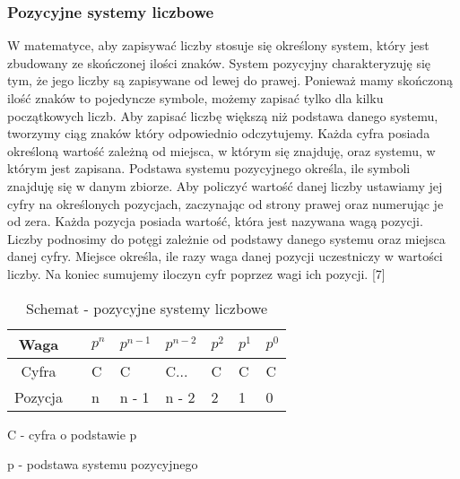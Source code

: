 \documentclass[12pt, a4paper, onside, polish]{article}				%
\begin{document}
\subsubsection{Pozycyjne systemy liczbowe}
\hspace{\parindent}
W matematyce, aby zapisywać liczby stosuje się określony system, który jest zbudowany ze skończonej ilości znaków. System pozycyjny charakteryzuję się tym, że jego liczby są zapisywane od lewej do prawej. Ponieważ mamy skończoną ilość znaków to pojedyncze symbole, możemy zapisać tylko dla kilku początkowych liczb. Aby zapisać liczbę większą niż podstawa danego systemu, tworzymy ciąg znaków który odpowiednio odczytujemy. Każda cyfra posiada określoną wartość zależną od miejsca, w którym się znajduję, oraz systemu, w którym jest zapisana. Podstawa systemu pozycyjnego określa, ile symboli znajduję się w danym zbiorze. Aby policzyć wartość danej liczby ustawiamy jej cyfry na określonych pozycjach, zaczynając od strony prawej oraz numerując je od zera. Każda pozycja posiada wartość, która jest nazywana wagą pozycji. Liczby podnosimy do potęgi zależnie od podstawy danego systemu oraz miejsca danej cyfry. Miejsce określa, ile razy waga danej pozycji uczestniczy w wartości liczby. Na koniec sumujemy iloczyn cyfr poprzez wagi ich pozycji. [7]


\begin{table}[H]
\caption{Schemat - pozycyjne systemy liczbowe}
\centering
\begin{tabular}{|cl|l|l|l|l|l|l|}
\hline
Waga    &  & $p^{n}$ & $p^{n - 1}$ & $p^{n - 2}$ & $p^{2}$ & $p^{1}$ & $p^{0}$ \\ \hline
Cyfra   &  & C                    & C                      & C...                   & C                    & C                    & C                    \\ \hline
Pozycja &  & n                    & n - 1                    & n - 2                    & 2                    & 1                    & 0                    \\ \hline
\end{tabular}
\end{table}

C - cyfra o podstawie p

p - podstawa systemu pozycyjnego
\end{document}
